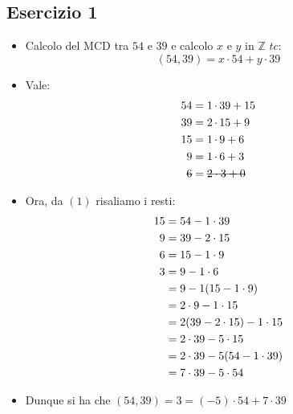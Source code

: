 \documentclass[10pt]{article}
\begin{document}
	\subsection{Esercizio 1}
	\begin{itemize}
	\item
	Calcolo del MCD tra $54$ e $39$ e calcolo $x$ e $y$ in $\mathbb{Z}$ $tc:$ $$(54,39) = x \cdot 54 + y \cdot 39$$
	\item
	Vale:
	\begin{equation}
	\begin{split}
	54 &= 1 \,\hbox{$\cdot$}\, 39 + 15 \\
	39 &= 2 \,\hbox{$\cdot$}\, 15 + 9 \\
	15 &= 1 \,\hbox{$\cdot$}\, 9 + 6 \\
	9 &= 1 \,\hbox{$\cdot$}\, 6 + 3 \\
	\hbox{\sout{$6$}} &= \hbox{\sout{$2 \cdot 3 + 0$}}
	\end{split}
	\end{equation}
	\item
	Ora, da $(1)$ risaliamo i resti:
	\begin{equation}
	\begin{split}
	15 &= 54 - 1 \cdot 39 \\
	9 &= 39 - 2 \cdot 15 \\
	6 &= 15 - 1 \cdot 9 \\
	3 &= 9 - 1 \cdot 6 \\
	& = 9 - 1 (15-1 \cdot 9) \\
	& = 2 \cdot 9 - 1 \cdot 15 \\
	& = 2(39 - 2 \cdot 15) - 1 \cdot 15 \\
	& = 2 \cdot 39 - 5 \cdot 15 \\
	& = 2 \cdot 39 - 5(54-1 \cdot 39) \\
	& = 7 \cdot 39 - 5 \cdot 54
	\notag
	\end{split}
	\end{equation}
	\item
	Dunque si ha che $(54,39) = 3 = (-5) \cdot 54 + 7 \cdot 39 $
	\end{itemize}
	
\end{document}

